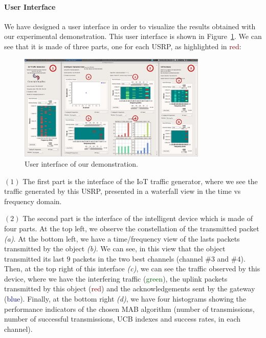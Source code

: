 \paragraph{User Interface}

We have designed a user interface in order to visualize the results obtained  with our experimental demonstration. This user interface is shown in Figure~\ref{fig:42:UI}.
We can see that it is made of three parts, one for each USRP, as highlighted in \textcolor{darkred}{red}:

\begin{figure}[!t]
    \centering
    \includegraphics[width=0.80\textwidth]{2-Chapters/4-Chapter/IEEE_WCNC_2019__DemoICT.git/pictures/UI.eps}
    \caption{User interface of our demonstration.}
    \label{fig:42:UI}
\end{figure}


$(1)$ The first part is the interface of the IoT traffic generator, where we see the traffic generated by this USRP, presented in a waterfall view in the time vs frequency domain.

$(2)$ The second part is the interface of the intelligent device which is made of four parts.
At the top left, we observe the constellation of the transmitted packet \emph{(a)}.
At the bottom left, we have a time/frequency view of the lasts packets transmitted by the object \emph{(b)}.
We can see, in this view that the object transmitted its last $9$ packets in the two best channels (channel $\#3$ and $\#4$).
Then, at the top right of this interface \emph{(c)}, we can see the traffic observed by this device, where we have the interfering traffic (\textcolor{darkgreen}{green}), the uplink packets transmitted by this object (\textcolor{darkred}{red}) and the acknowledgements sent by the gateway (\textcolor{darkblue}{blue}).
Finally, at the bottom right \emph{(d)}, we have four histograms showing the performance indicators of the chosen MAB algorithm (number of transmissions, number of successful transmissions, UCB indexes and success rates, in each channel).

